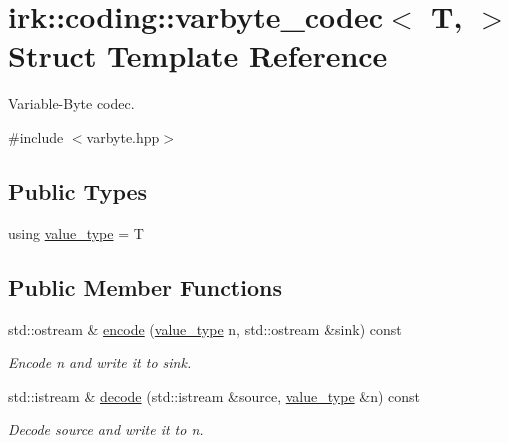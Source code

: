 \hypertarget{structirk_1_1coding_1_1varbyte__codec}{}\section{irk\+:\+:coding\+:\+:varbyte\+\_\+codec$<$ T, $>$ Struct Template Reference}
\label{structirk_1_1coding_1_1varbyte__codec}


Variable-\/\+Byte codec.  




{\ttfamily \#include $<$varbyte.\+hpp$>$}

\subsection*{Public Types}
\begin{DoxyCompactItemize}
\item 
using \mbox{\hyperlink{structirk_1_1coding_1_1varbyte__codec_addad40df722d08275853597cbe8e178b}{value\+\_\+type}} = T
\end{DoxyCompactItemize}
\subsection*{Public Member Functions}
\begin{DoxyCompactItemize}
\item 
std\+::ostream \& \mbox{\hyperlink{structirk_1_1coding_1_1varbyte__codec_a330889102c7d1c2213eba270ee64e2f5}{encode}} (\mbox{\hyperlink{structirk_1_1coding_1_1varbyte__codec_addad40df722d08275853597cbe8e178b}{value\+\_\+type}} n, std\+::ostream \&sink) const
\begin{DoxyCompactList}\small\item\em Encode {\ttfamily n} and write it to {\ttfamily sink}. \end{DoxyCompactList}\item 
std\+::istream \& \mbox{\hyperlink{structirk_1_1coding_1_1varbyte__codec_a97cd396398669567fbfca7e6d1f6468a}{decode}} (std\+::istream \&source, \mbox{\hyperlink{structirk_1_1coding_1_1varbyte__codec_addad40df722d08275853597cbe8e178b}{value\+\_\+type}} \&n) const
\begin{DoxyCompactList}\small\item\em Decode {\ttfamily source} and write it to {\ttfamily n}. \end{DoxyCompactList}\end{DoxyCompactItemize}


